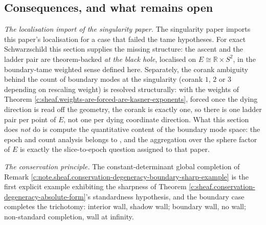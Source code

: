 \documentclass[11pt]{article}
\theoremstyle{definition}
\theoremstyle{plain}
\providecommand{\R}{}\renewcommand{\R}{\mathbb{R}}
\begin{document}
\subsection*{Consequences, and what remains open}
\label{c:note.sheaf.setting-consequences-what-remains-open}
\emph{The localisation import of the singularity paper.} The singularity paper \cite{ButlerT5} imports this paper's localisation for a case that failed the tame hypotheses. For exact Schwarzschild this section supplies the missing structure: the ascent and the ladder pair are theorem-backed \emph{at the black hole}, localised on $E \cong \R \times S^2$, in the boundary-tame weighted sense defined here. Separately, the corank ambiguity behind the count of boundary modes at the singularity (corank $1$, $2$ or $3$ depending on rescaling weight) is resolved structurally: with the weights of Theorem \ref{c:sheaf.weights-are-forced-are-kasner-exponents}, forced once the dying direction is read off the geometry, the corank is exactly one, so there is one ladder pair per point of $E$, not one per dying coordinate direction. What this section does \emph{not} do is compute the quantitative content of the boundary mode space: the epoch and count analysis belongs to \cite{ButlerT8}, and the aggregation over the sphere factor of $E$ is exactly the slice-to-epoch question assigned to that paper.

\emph{The conservation principle.} The constant-determinant global completion of Remark \ref{c:note.sheaf.conservation-degeneracy-boundary-sharp-example} is the first explicit example exhibiting the sharpness of Theorem \ref{c:sheaf.conservation-degeneracy-absolute-form}'s standardness hypothesis, and the boundary case completes the trichotomy: interior wall, shadow wall; boundary wall, no wall; non-standard completion, wall at infinity.
\end{document}
